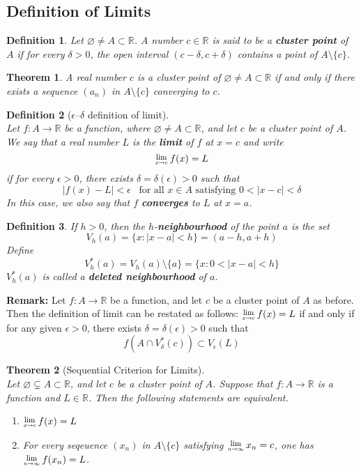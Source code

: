 \documentclass[8pt]{article}
\newcommand{\Lim}[1]{\raisebox{0.5ex}{\scalebox{0.8}{$\displaystyle \lim_{#1}\;$}}}
\newtheorem{definition}{Definition}[section]
\newtheorem{theorem}{Theorem}[section]
\theoremstyle{definition}
\begin{document}
\subsection{Definition of Limits}
\begin{definition}\normalfont Let $\varnothing\neq A\subset\mathbb{R}$. A number $c\in\mathbb{R}$ is said to be a \textbf{cluster point} of $A$ if for every $\delta>0$, the open interval $(c-\delta, c+\delta)$ contains a point of $A\setminus\{c\}$.
\end{definition}
\begin{theorem}\normalfont A real number $c$ is a cluster point of $\varnothing\neq A\subset \mathbb{R}$ if and only if there exists a sequence $(a_n)$ in $A\setminus\{c\}$ converging to $c$.
\end{theorem}
\begin{definition}[$\epsilon$--$\delta$ definition of limit]
\hfill\\\normalfont Let $f:A\to \mathbb{R}$ be a function, where $\varnothing\neq A\subset \mathbb{R}$, and let $c$ be a cluster point of $A$. We say that a real number $L$ is the \textbf{limit} of $f$ at $x=c$ and write
\[
\Lim{x\to c}f(x)=L
\]
if for every $\epsilon>0$, there exists $\delta = \delta(\epsilon)>0$ such that
\[
|f(x)-L|<\epsilon\;\;\;\text{for all }x\in A\text{ satisfying }0<|x-c|<\delta 
\]
In this case, we also say that $f$ \textbf{converges} to $L$ at $x=a$.
\end{definition}
\begin{definition}\normalfont If $h>0$, then the $h$-\textbf{neighbourhood} of the point $a$ is the set
\[
V_h(a)=\{x:|x-a|<h\}=(a-h,a+h)
\]
Define
\[
V_h^\ast(a)=V_h(a)\setminus \{a\}=\{x:0<|x-a|<h\}
\]
$V_h^\ast(a)$ is called a \textbf{deleted neighbourhood} of $a$.
\end{definition}
\textbf{Remark:} Let $f:A\to\mathbb{R}$ be a function, and let $c$ be a cluster point of $A$ as before. Then the definition of limit can be restated as follows: $\Lim{x\to c}f(x)=L$ if and only if for any given $\epsilon>0$, there exists $\delta=\delta(\epsilon)>0$ such that
\[
f(A\cap V_\delta^\ast(c))\subset V_\epsilon(L)
\]
\begin{theorem}[Sequential Criterion for Limits]
\hfill\\\normalfont Let $\varnothing\subsetneq A\subset\mathbb{R}$, and let $c$ be a cluster point of $A$. Suppose that $f:A\to \mathbb{R}$ is a function and $L\in\mathbb{R}$. Then the following statements are equivalent.
\begin{enumerate}
\item $\Lim{x\to c}f(x)=L$
\item For every seqeuence $(x_n)$ in $A\setminus\{c\}$ satisfying $\Lim{n\to\infty}x_n = c$, one has $\Lim{n\to\infty}f(x_n)=L$.
\end{enumerate}
\end{theorem}
\end{document}
